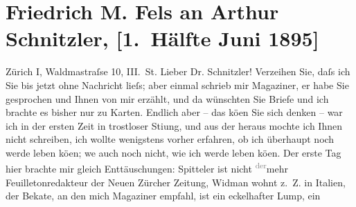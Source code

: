                \section[Friedrich M. Fels an Arthur Schnitzler, {[}1. Hälfte Juni 1895{]}]{ Friedrich M. Fels an Arthur Schnitzler, {[}1. Hälfte Juni 1895{]}}\nopagebreak{}\rehead{ }\begin{ledgroupsized}[t]{13cm}\normalsize\beginnumbering \toendnotes[C]{\smallbreak\pagebreak[2]} 
\toendnotes[C]{\smallbreak}\pstart
           \raggedleft{}{\pb}Zürich I, Waldma{\geminationn}straſse 10, III. St.\pend
           \pstart{}Lieber Dr. Schnitzler!\pend\pstart
           Verzeihen Sie, daſs ich Sie bis jetzt ohne Nachricht lieſs; aber einmal schrieb mir
                  Magaziner, er habe Sie gesprochen und Ihnen
               von mir erzählt, und da{\geminationn} wünschten Sie Briefe und \introOben{}ich\introOben{} brachte es bisher nur zu Karten. Endlich aber – das kö{\geminationn}en Sie sich denken – war ich in der ersten Zeit in
               trostloser Sti{\geminationm}ung, und aus der heraus mochte ich Ihnen
               nicht schreiben, ich wollte wenigstens vorher erfahren, ob ich überhaupt noch werde
               leben kö{\geminationn}en; we{\geminationn} auch noch
               nicht, wie ich werde leben kö{\geminationn}en. Der erste Tag hier
               brachte mir gleich Enttäuschungen: Spitteler
               ist nicht \substVorne{}\textsuperscript{\textcolor{gray}{der}}\substDazwischen{}mehr\substHinten{} Feuilletonredakteur der Neuen Zürcher
                  Zeitung, Widman wohnt z. Z. in Italien,
               der Beka{\geminationn}te, an den mich Magaziner empfahl, ist ein eckelhafter Lump, ein

\end{ledgroupsized}
